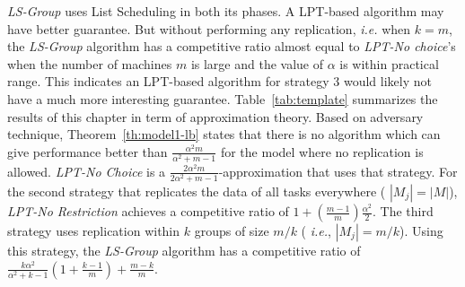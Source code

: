 \documentclass[12pt]{article}
\theoremstyle{mystyle}
\newtheorem{corollary}{Corollary}[theorem]
\begin{document}
    
    \textit{LS-Group} uses List Scheduling in both its phases. A LPT-based
    algorithm may have better guarantee. But without performing any
    replication, {\em i.e.} when $k=m$, the \textit{LS-Group} algorithm
    has a competitive ratio almost equal to \textit{LPT-No choice}'s when
    the number of machines $m$ is large and the value of $\alpha$ is
    within practical range. This indicates an LPT-based algorithm for
    strategy 3 would likely not have a much more interesting guarantee.
    \label{ch4:summary}
     Table~\ref{tab:template} summarizes the results of this chapter in term
     of approximation theory. Based on adversary technique,
     Theorem~\ref{th:model1-lb} states that there is no algorithm which can
     give performance better than $\frac{\alpha^{2}m }{\alpha^{2} + m-1}$ for the model where no
     replication is allowed. {\it LPT-No Choice} is a
     $\frac{2\alpha^{2}m}{2\alpha^{2}+ m-1}$-approximation that uses that
     strategy. For the second strategy that replicates the data of all
     tasks everywhere ( $|M_j| = |M|$), {\it LPT-No Restriction} achieves a
     competitive ratio of $1 + (\frac{m-1}{m})\frac{\alpha^{2}}{2}$.  The
     third strategy uses replication within $k$ groups of size $m/k$ ({\em
       i.e.}, $|M_j| = m/k$). Using this strategy, the {\it LS-Group}
     algorithm has a competitive ratio of
     $\frac{k\alpha^{2}}{\alpha^{2}+k-1}\left( 1+ {\frac{k-1}{m}} \right) +
     {\frac{m-k}{m}}$.\\
     
     
     
\end{document}

